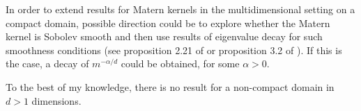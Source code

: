 \documentclass{article}
\begin{document}
In order to extend results for Matern kernels in the multidimensional setting on a compact domain, possible direction could be to explore whether the Matern kernel is Sobolev smooth and then use results of eigenvalue decay for such smoothness conditions (see proposition 2.21 of \cite{schwab_karhunenloeve_2006} or proposition 3.2 of \cite{todor_robust_2006}). If this is the case, a decay of $m^{-\alpha / d}$ could be obtained, for some $\alpha > 0$.

To the best of my knowledge, there is no result for a non-compact domain in $d > 1$ dimensions. 

\end{document}
